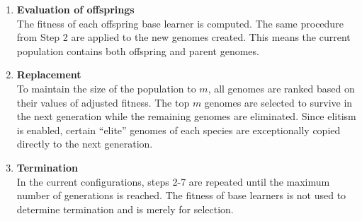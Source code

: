 \begin{enumerate}
    \begin{equation}
        \label{equation:neat_ncl_dynamic_lambda}
        \lambda = \lambda_{max} - \frac{D}{D_{max}} \times (\lambda_{max} - \lambda_{min})
    \end{equation}

    where $\lambda_{max}$ and $\lambda_{min}$ correspond to the upper and lower bounds values of $\lambda$ set by developers. Thus, $\lambda$ varies from $\lambda_{min}$ to $\lambda_{max}$. $D$ is the population diversity computed in the current population. $D_{max}$ is the maximum population diversity recorded in the population. 

    Equation~\ref{equation:neat_ncl_dynamic_lambda} requires $D$, which is dynamically computed (refer to Section~\ref{subsubsec:neat_ncl_population_diversity} for the calculation steps). Based on Equation~\ref{equation:neat_ncl_dynamic_lambda}, $\lambda$ is set to a very large number initially (because the initial population has little diversity, i.e. small $D$) and it is decreased gradually until it reaches its optimal value. In other words, diversity of base learners is prioritised at the beginning but accuracy receives more attention as there are more diverse genomes in the population. 

    \item \textbf{Evaluation of offsprings} \\
    The fitness of each offspring base learner is computed. The same procedure from Step 2 are applied to the new genomes created. This means the current population contains both offspring and parent genomes. 

    \item \textbf{Replacement} \\
    To maintain the size of the population to $m$, all genomes are ranked based on their values of adjusted fitness. The top $m$ genomes are selected to survive in the next generation while the remaining genomes are eliminated. Since elitism is enabled, certain ``elite'' genomes of each species are exceptionally copied directly to the next generation. 

    \item \textbf{Termination} \\
    In the current configurations, steps 2-7 are repeated until the maximum number of generations is reached. The fitness of base learners is not used to determine termination and is merely for selection. 
\end{enumerate}


